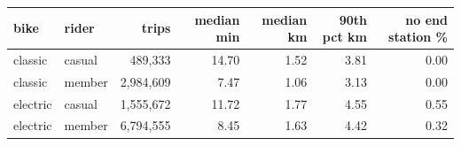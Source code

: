 \begin{tabular}{llrrrrr}
\toprule
\textbf{bike} & \textbf{rider} & \textbf{trips} & \textbf{median min} & \textbf{median km} & \textbf{90th pct km} & \textbf{no end station \%} \\
\midrule
classic & casual & 489,333 & 14.70 & 1.52 & 3.81 & 0.00 \\
classic & member & 2,984,609 & 7.47 & 1.06 & 3.13 & 0.00 \\
electric & casual & 1,555,672 & 11.72 & 1.77 & 4.55 & 0.55 \\
electric & member & 6,794,555 & 8.45 & 1.63 & 4.42 & 0.32 \\
\bottomrule
\end{tabular}
